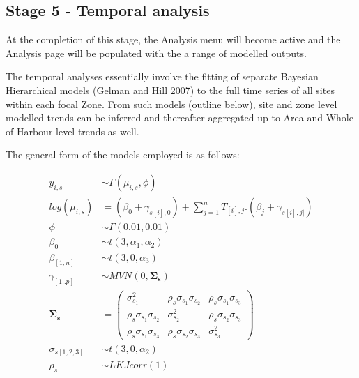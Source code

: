 \documentclass[
  8pt,
  a4paper]{article}
\begin{document}
\subsection{Stage 5 - Temporal
analysis}\label{stage-5---temporal-analysis}

At the completion of this stage, the Analysis menu will become active
and the Analysis page will be populated with the a range of modelled
outputs.

The temporal analyses essentially involve the fitting of separate
Bayesian Hierarchical models (Gelman and Hill 2007) to the full time
series of all sites within each focal Zone. From such models (outline
below), site and zone level modelled trends can be inferred and
thereafter aggregated up to Area and Whole of Harbour level trends as
well.

The general form of the models employed is as follows:

\[
\begin{aligned}
y_{i,s} &\sim{} \Gamma(\mu_{i,s}, \phi)\\
log(\mu_{i,s}) &= (\beta_0 + \gamma_{s[i],0}) + \sum_{j=1}^nT_{[i],j}.(\beta_j + \gamma_{s[i],j]})\\
\phi&\sim\Gamma(0.01, 0.01)\\
\beta_0&\sim{}\mathit{t}(3, \alpha_1, \alpha_2)\\
\beta_{[1,n]}&\sim{}\mathit{t}(3, 0, \alpha_3)\\
\gamma_{[1..p]}&\sim{}MVN(0, \boldsymbol{\Sigma_s})\\
\boldsymbol{\Sigma_s} &=
{\begin{pmatrix}
\sigma_{s_1}^2 & \rho_s \sigma_{s_1} \sigma_{s_2} & \rho_s \sigma_{s_1} \sigma_{s_3}\\
\rho_s \sigma_{s_1} \sigma_{s_2} & \sigma_{s_2}^2 & \rho_s \sigma_{s_2} \sigma_{s_3}\\
\rho_s \sigma_{s_1} \sigma_{s_3}  & \rho_s \sigma_{s_2} \sigma_{s_3} & \sigma_{s_3}^2
\end{pmatrix}}\\
\sigma_{s[1,2,3]} &\sim \mathit{t}(3, 0, \alpha_2)\\
\rho_s &\sim \mathit{LKJcorr}(1)\\
\end{aligned}
\]
\end{document}
